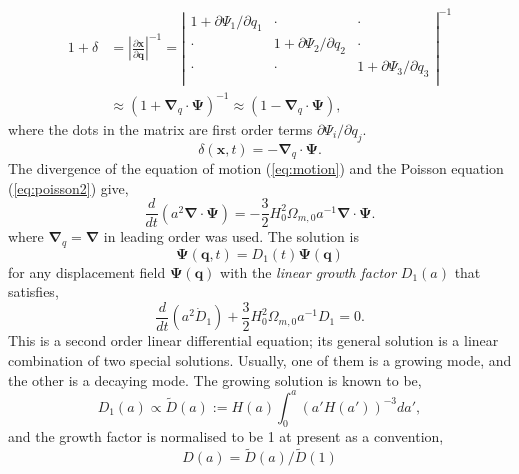 \documentclass[a4paper]{article}
\begin{document}
\begin{align}
  1 + \delta
    &= \left| \frac{\partial \bm{x}}{\partial \bm{q}} \right|^{-1}
     = \left|
         \begin{array}{ccc}
           1 + \partial \Psi_1/\partial q_1 & \cdot & \cdot  \\
           \cdot &  1 + \partial \Psi_2/\partial q_2 & \cdot \\
          \cdot &  \cdot & 1 + \partial \Psi_3/\partial q_3 \\
         \end{array}
       \right|^{-1}\\
       &\approx (1 + \bm{\nabla}_q \cdot \bm{\Psi})^{-1}
       \approx (1 - \bm{\nabla}_q \cdot \bm{\Psi}),
\end{align}
where the dots in the matrix are first order terms $\partial
\Psi_i/\partial q_j$.
\begin{equation}
  \delta(\bm{x}, t) = - \bm{\nabla}_q \cdot \bm{\Psi}.
\end{equation}
The divergence of the equation of motion (\ref{eq:motion}) and the
Poisson equation (\ref{eq:poisson2}) give,
\begin{equation}
  \frac{d}{dt} \left( a^2 \bm{\nabla}\cdot\bm{\Psi} \right)
  = -\frac{3}{2} H_0^2 \Omega_{m,0} a^{-1} \bm{\nabla}\cdot\bm{\Psi}.
\end{equation}
where $\bm{\nabla}_q = \bm{\nabla}$ in leading order was used.
The solution is
\begin{equation}
  \bm{\Psi}(\bm{q}, t) = D_1(t) \bm{\Psi}(\bm{q})
\end{equation}
for any displacement field $\bm{\Psi}(\bm{q})$ with the \textit{linear growth factor} $D_1(a)$ that satisfies,
\begin{equation}
  \label{eq:linear-growth-factor}
  \frac{d}{dt}\left( a^2 \dot{D}_1 \right)
  + \frac{3}{2} H_0^2 \Omega_{m,0} a^{-1} D_1 = 0.
\end{equation}
This is a second order linear differential equation; its general
solution is a linear combination of two special solutions. Usually,
one of them is a growing mode, and the other is a decaying mode. The
growing solution is known to be,
\begin{equation}
  D_1(a) \propto \tilde{D}(a) := H(a) \int_0^a \left( a'H(a') \right)^{-3} da',
\end{equation}
and the growth factor is normalised to be 1 at present as a convention,
\begin{equation}
  D(a) = \tilde{D}(a)/\tilde{D}(1)
\end{equation}
\end{document}
